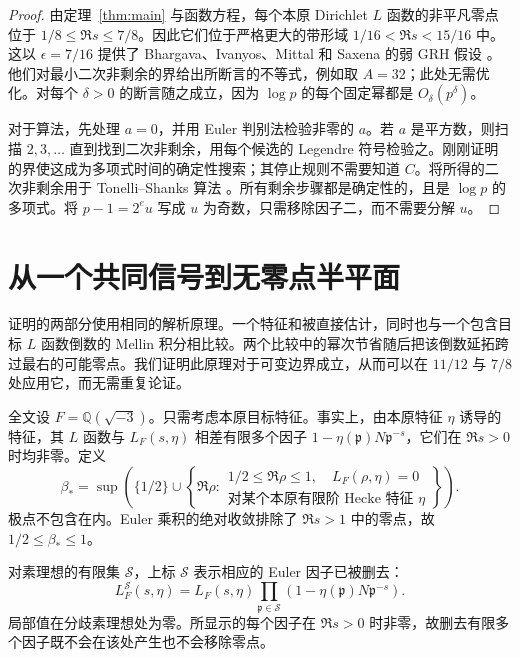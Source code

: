 \documentclass[11pt,a4paper]{article}
\numberwithin{equation}{section}
\numberwithin{figure}{section}
\theoremstyle{definition}
\theoremstyle{remark}
\begin{document}
\begin{proof}
由定理~\ref{thm:main} 与函数方程，每个本原 Dirichlet $L$ 函数的非平凡零点位于 $1/8\le\Re s\le7/8$。因此它们位于严格更大的带形域 $1/16<\Re s<15/16$ 中。这以 $\epsilon=7/16$ 提供了 Bhargava、Ivanyos、Mittal 和 Saxena 的弱 GRH 假设 \cite[猜想 6.3 与定理 6.7]{BIMS}。他们对最小二次非剩余的界给出所断言的不等式，例如取 $A=32$；此处无需优化。对每个 $\delta>0$ 的断言随之成立，因为 $\log p$ 的每个固定幂都是 $O_\delta(p^\delta)$。

对于算法，先处理 $a=0$，并用 Euler 判别法检验非零的 $a$。若 $a$ 是平方数，则扫描 $2,3,\ldots$ 直到找到二次非剩余，用每个候选的 Legendre 符号检验之。刚刚证明的界使这成为多项式时间的确定性搜索；其停止规则不需要知道 $C$。将所得的二次非剩余用于 Tonelli--Shanks 算法 \cite[第 2.9 节，算法 3 与引理 2.9.5]{Galbraith}。所有剩余步骤都是确定性的，且是 $\log p$ 的多项式。将 $p-1=2^e u$ 写成 $u$ 为奇数，只需移除因子二，而不需要分解 $u$。
\end{proof}

\section{从一个共同信号到无零点半平面}
\label{sec:analytic-reduction}

证明的两部分使用相同的解析原理。一个特征和被直接估计，同时也与一个包含目标 $L$ 函数倒数的 Mellin 积分相比较。两个比较中的幂次节省随后把该倒数延拓跨过最右的可能零点。我们证明此原理对于可变边界成立，从而可以在 $11/12$ 与 $7/8$ 处应用它，而无需重复论证。

全文设 $F=\mathbb Q(\sqrt{-3})$。只需考虑本原目标特征。事实上，由本原特征 $\eta$ 诱导的特征，其 $L$ 函数与 $L_F(s,\eta)$ 相差有限多个因子 $1-\eta(\mathfrak p)N\mathfrak p^{-s}$，它们在 $\Re s>0$ 时均非零。定义
\begin{equation}
 \beta_* = \sup\left(\{1/2\}\cup
 \left\{\Re\rho:\begin{array}{l}
  1/2\le\Re\rho\le1,\quad L_F(\rho,\eta)=0\\
  \text{对某个本原有限阶 Hecke 特征 }\eta
 \end{array}\right\}\right).
 \label{old-eq:1.1b}
\end{equation}
极点不包含在内。Euler 乘积的绝对收敛排除了 $\Re s>1$ 中的零点，故 $1/2\le\beta_*\le1$。

对素理想的有限集 $\mathcal S$，上标 $\mathcal S$ 表示相应的 Euler 因子已被删去：
\[
 L_F^{\mathcal S}(s,\eta)
 =L_F(s,\eta)\prod_{\mathfrak p\in\mathcal S}
       (1-\eta(\mathfrak p)N\mathfrak p^{-s}).
\]
局部值在分歧素理想处为零。所显示的每个因子在 $\Re s>0$ 时非零，故删去有限多个因子既不会在该处产生也不会移除零点。
\end{document}
